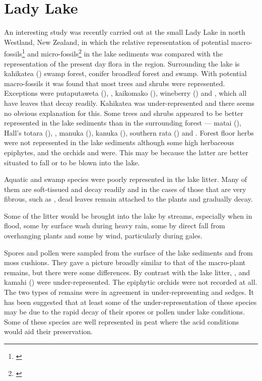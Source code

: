\section{Lady Lake}

An interesting study was recently carried out at the small Lady Lake in north Westland, New Zealand, in which the relative representation of potential macro-fossils\footnote{\cite{drake1980influx}} and micro-fossils\footnote{\cite{pocknall1980modern}} in the lake sediments was compared with the representation of the present day flora in the region.
Surrounding the lake is kahikatea () swamp forest, conifer broadleaf forest and swamp.
With potential macro-fossils it was found that most trees and shrubs were represented.
Exceptions were putaputaweta (),  , kaikomako (), wineberry () and , which all have leaves that decay readily.
Kahikatea was under-represented and there seems no obvious explanation for this.
Some trees and shrubs appeared to be better represented in the lake sediments than in the surrounding forest — matai (), Hall's totara (), , manuka (), kanuka (), southern rata () and .
Forest floor herbs were not represented in the lake sediments although some high herbaceous epiphytes,  and the orchids  and  were.
This may be because the latter are better situated to fall or to be blown into the lake.

Aquatic and swamp species were poorly represented in the lake litter.
Many of them are soft-tissued and decay readily and in the cases of those that are very fibrous, such as , dead leaves remain attached to the plants and gradually decay.

Some of the litter would be brought into the lake by streams, especially when in flood, some by surface wash during heavy rain, some by direct fall from overhanging plants and some by wind, particularly during gales.

Spores and pollen were sampled from the surface of the lake sediments and from moss cushions.
They gave a picture broadly similar to that of the macro-plant remains, but there were some differences.
By contrast with the lake litter, ,   and kamahi () were under-represented.
The epiphytic orchids were not recorded at all.
The two types of remains were in agreement in under-representing  and sedges.
It has been suggested that at least some of the under-representation of these species may be due to the rapid decay of their spores or pollen under lake conditions.
Some of these species are well represented in peat where the acid conditions would aid their preservation.

